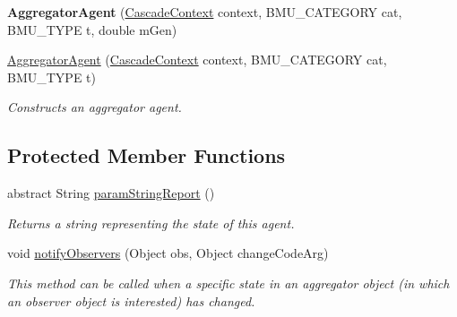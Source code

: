 \begin{DoxyCompactItemize}
\item 
\hypertarget{classuk_1_1ac_1_1dmu_1_1iesd_1_1cascade_1_1agents_1_1aggregators_1_1_aggregator_agent_ad93533fde807d68b99b25956af90c71c}{{\bfseries Aggregator\-Agent} (\hyperlink{classuk_1_1ac_1_1dmu_1_1iesd_1_1cascade_1_1context_1_1_cascade_context}{Cascade\-Context} context, B\-M\-U\-\_\-\-C\-A\-T\-E\-G\-O\-R\-Y cat, B\-M\-U\-\_\-\-T\-Y\-P\-E t, double m\-Gen)}\label{classuk_1_1ac_1_1dmu_1_1iesd_1_1cascade_1_1agents_1_1aggregators_1_1_aggregator_agent_ad93533fde807d68b99b25956af90c71c}

\item 
\hyperlink{classuk_1_1ac_1_1dmu_1_1iesd_1_1cascade_1_1agents_1_1aggregators_1_1_aggregator_agent_a7d2eebab69b054ae0cd32f511df26b41}{Aggregator\-Agent} (\hyperlink{classuk_1_1ac_1_1dmu_1_1iesd_1_1cascade_1_1context_1_1_cascade_context}{Cascade\-Context} context, B\-M\-U\-\_\-\-C\-A\-T\-E\-G\-O\-R\-Y cat, B\-M\-U\-\_\-\-T\-Y\-P\-E t)
\begin{DoxyCompactList}\small\item\em Constructs an aggregator agent. \end{DoxyCompactList}\end{DoxyCompactItemize}
\subsection*{Protected Member Functions}
\begin{DoxyCompactItemize}
\item 
abstract String \hyperlink{classuk_1_1ac_1_1dmu_1_1iesd_1_1cascade_1_1agents_1_1aggregators_1_1_aggregator_agent_a3496e7d27cc39d210523450742efede8}{param\-String\-Report} ()
\begin{DoxyCompactList}\small\item\em Returns a string representing the state of this agent. \end{DoxyCompactList}\item 
void \hyperlink{classuk_1_1ac_1_1dmu_1_1iesd_1_1cascade_1_1agents_1_1aggregators_1_1_aggregator_agent_ae992cbda093853f4bd01eea488546156}{notify\-Observers} (Object obs, Object change\-Code\-Arg)
\begin{DoxyCompactList}\small\item\em This method can be called when a specific state in an aggregator object (in which an observer object is interested) has changed. \end{DoxyCompactList}\end{DoxyCompactItemize}
